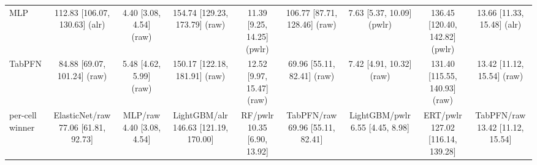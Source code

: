 \begin{table}[h]
\begin{tabular}{lcccccccc}
MLP & 112.83 [106.07, 130.63] (alr) & 4.40 [3.08, 4.54] (raw) & 154.74 [129.23, 173.79] (raw) & 11.39 [9.25, 14.25] (pwlr) & 106.77 [87.71, 128.46] (raw) & 7.63 [5.37, 10.09] (pwlr) & 136.45 [120.40, 142.82] (pwlr) & 13.66 [11.33, 15.48] (alr) \\
TabPFN & 84.88 [69.07, 101.24] (raw) & 5.48 [4.62, 5.99] (raw) & 150.17 [122.18, 181.91] (raw) & 12.52 [9.97, 15.47] (raw) & 69.96 [55.11, 82.41] (raw) & 7.42 [4.91, 10.32] (raw) & 131.40 [115.55, 140.93] (raw) & 13.42 [11.12, 15.54] (raw) \\
per-cell winner & ElasticNet/raw 77.06 [61.81, 92.73] & MLP/raw 4.40 [3.08, 4.54] & LightGBM/alr 146.63 [121.19, 170.00] & RF/pwlr 10.35 [6.90, 13.92] & TabPFN/raw 69.96 [55.11, 82.41] & LightGBM/pwlr 6.55 [4.45, 8.98] & ERT/pwlr 127.02 [116.14, 139.28] & TabPFN/raw 13.42 [11.12, 15.54] \\
\bottomrule
\end{tabular}
\end{table}